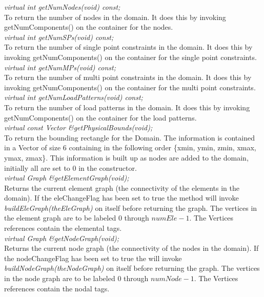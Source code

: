 {{\em virtual int getNumNodes(void) const;}\\
To return the number of nodes in the domain. It does this by
invoking getNumComponents() on the container for the
nodes. \\

{\em virtual int getNumSPs(void) const;}\\
To return the number of single point constraints in the domain. It
does this by invoking getNumComponents() on the container for
the single point constraints. \\

{\em virtual int getNumMPs(void) const;}\\
To return the number of multi point constraints in the domain. It
does this by invoking getNumComponents() on the container for
the multi point constraints. \\

{\em virtual int getNumLoadPatterns(void) const;}\\
To return the number of load patterns in the domain. It
does this by invoking getNumComponents() on the container for
the load patterns. \\

{\em virtual const Vector \&getPhysicalBounds(void);} \\
To return the bounding rectangle for the Domain. The information is
contained in a Vector of size 6 containing in the following order
\{xmin, ymin, zmin, xmax, ymax, zmax\}. This information is built up
as nodes are added to the domain, initially all are set to $0$ in the
constructor. \\

{\em virtual Graph \&getElementGraph(void);} \\
Returns the current element graph (the connectivity of the elements
in the domain). If the \p eleChangeFlag has been set
to \p true the method will invoke {\em buildEleGraph(theEleGraph)}
on itself before returning the graph. The vertices in the element
graph are to be labeled $0$ through $numEle-1$. The Vertices references
contain the elemental tags. \\ 

{\em virtual Graph \&getNodeGraph(void);} \\
Returns the current node graph (the connectivity of the nodes in
the domain). If the \p nodeChangeFlag has been set to \p true the
will invoke {\em buildNodeGraph(theNodeGraph)} on itself before
returning the graph. The vertices in the node graph are to be labeled
$0$ through $numNode-1$. The Vertices references contain the nodal tags. \\ 


}
